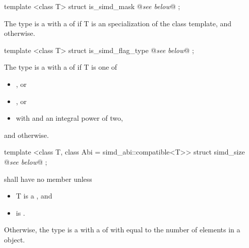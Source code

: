 \begin{itemdecl}
template <class T> struct is_simd_mask { @\emph{see below}@ };
\end{itemdecl}
\begin{itemdescr}
  \pnum The type  is a \UnaryTypeTrait with a \BaseCharacteristic of  if \type T is an specialization of the \mask class template, and  otherwise.

  \pnum{}
\end{itemdescr}

\begin{itemdecl}
template <class T> struct is_simd_flag_type { @\emph{see below}@ };
\end{itemdecl}\label{is_simd_flag_type}
\begin{itemdescr}
  \pnum The type  is a \UnaryTypeTrait with a \BaseCharacteristic of  if \type T is one of
  \begin{itemize}
    \item {}, or
    \item {}, or
    \item {} with  and  an integral power of two,
  \end{itemize}
  and  otherwise.

  \pnum{}
\end{itemdescr}

\begin{itemdecl}
template <class T, class Abi = simd_abi::compatible<T>> struct simd_size { @\emph{see below}@ };
\end{itemdecl}
\begin{itemdescr}
  \pnum\label{simd_size}%
   shall have no member  unless
  \begin{itemize}
    \item \type T is a \realArithmeticType, and
    \item {} is \true.
  \end{itemize}

  \pnum
  Otherwise, the type  is a \BinaryTypeTrait with a \BaseCharacteristic of  with  equal to the number of elements in a \simd[<T, Abi>] object.

  \pnum{}

\end{itemdescr}

